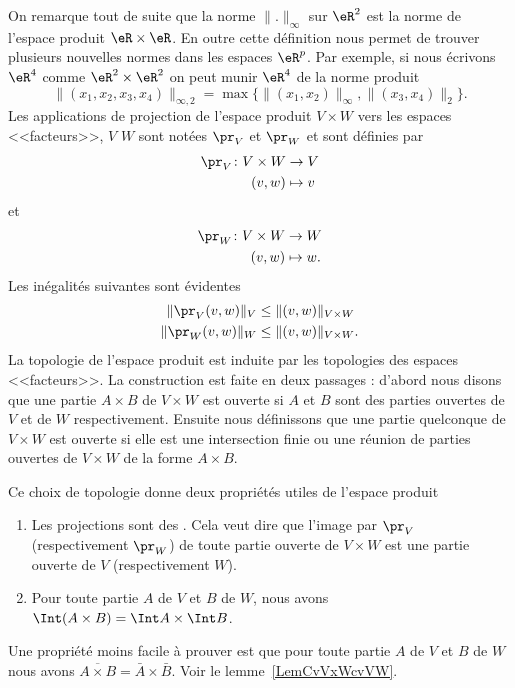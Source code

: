 On remarque tout de suite que la norme $\|.\|_\infty$ sur $\eR^2$ est la norme de l'espace produit $\eR\times\eR$. En outre cette définition nous permet de trouver plusieurs nouvelles normes dans les espaces $\eR^p$. Par exemple, si nous écrivons $\eR^4$ comme $\eR^2\times \eR^2$ on peut munir $\eR^4$ de la norme produit
\[
\|(x_1,x_2,x_3,x_4)\|_{\infty, 2}=\max\{\|(x_1,x_2)\|_\infty, \|(x_3,x_4)\|_2\}.
\]
Les applications de projection de l'espace produit $V\times W$ vers les espaces <<facteurs>>, $V$ $W$ sont notées $\pr_V$ et $\pr_W$ et sont définies par
\begin{equation}
    \begin{aligned}
        \pr_V\colon V\times W & \to V   \\
                    (v,w)     & \mapsto v
    \end{aligned}
\end{equation}
et
\begin{equation}
    \begin{aligned}
        \pr_W\colon V\times W & \to W   \\
                    (v,w)     & \mapsto w.
    \end{aligned}
\end{equation}
Les inégalités suivantes sont évidentes
\begin{equation}
    \begin{aligned}[]
        \|\pr_V(v,w)\|_V  & \leq \|(v,w)\|_{V\times W}      \\
        \|\pr_W(v,w)\|_W  & \leq \|(v,w)\|_{V\times W}.
    \end{aligned}
\end{equation}
La topologie de l'espace produit est induite par les topologies des espaces <<facteurs>>. La construction est faite en deux passages : d'abord nous disons que une partie $A\times B$ de $V\times W$ est ouverte si $A$ et $B$ sont des parties ouvertes de $V$ et de $W$ respectivement.  Ensuite nous définissons que une partie quelconque de $V\times W$ est ouverte si elle est une intersection finie ou une réunion de parties ouvertes de $V\times W$ de la forme $A\times B$.

Ce choix de topologie donne deux propriétés utiles de l'espace produit
\begin{enumerate}
    \item
        Les projections sont des . Cela veut dire que l'image par $\pr_V$ (respectivement $\pr_W$) de toute partie ouverte de $V\times W$ est une partie ouverte de $V$ (respectivement $W$).
    \item
        Pour toute partie $A$ de $V$ et $B$ de $W$, nous avons $\Int (A\times B)=\Int A\times \Int B$.\label{PgovlABeqbAbB}
\end{enumerate}
Une propriété moins facile à prouver est que pour toute partie $A$ de $V$ et $B$ de $W$ nous avons  $\overline{A\times B}=\bar{A}\times \bar{B}$. Voir le lemme~\ref{LemCvVxWcvVW}.

